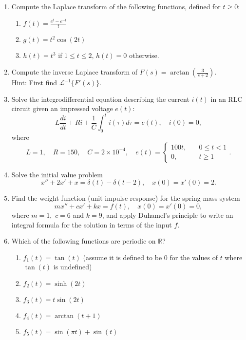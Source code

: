 \documentclass[11 pt]{article}
\newcommand{\R}{\mathbb{R}}
\newcommand{\calL}{\mathcal{L}}
\renewcommand{\t}{\tau}
\begin{document}
\begin{enumerate}
\item Compute the Laplace transform of the following functions, defined for $t\geq 0$:
\begin{enumerate}
     \item $\displaystyle f(t)=\frac{e^t-e^{-t}}{t}$ 

     \item $g(t)=t^2\cos(2t)$
     \item $h(t)=t^3$ if $1\leq t\leq 2$, $h(t)=0$ otherwise.
 \end{enumerate} 

\item Compute the inverse Laplace transform of $F(s)=\arctan \left(\frac{3}{s+2}\right)$. \\
Hint: First find $\calL^{-1}\{F'(s)\}$.


\item Solve the integrodifferential equation describing the current $i(t)$ in an RLC circuit given an impressed voltage $e(t):$
\begin{equation}
    L\frac{di}{dt}+R i+\frac{1}{C}\int_0^t i(\t)d\t =e(t), \quad i(0)=0,
\end{equation}
where
\begin{equation}
    L=1,\quad R=150,\quad C=2\times 10^{-4}, \quad  e(t)=\begin{cases}
        100t, \quad & 0\leq t<1\\
        0, \quad & t\geq 1
    \end{cases}.
\end{equation}



\item Solve the initial value problem
\begin{equation}
    x''+2x'+x=\delta(t)-\delta(t-2), \quad x(0)=x'(0)=2.
\end{equation}


\item Find the weight function (unit impulse response)  for the spring-mass system
\begin{equation}
    mx''+cx'+kx=f(t), \quad x(0)=x'(0)=0,
\end{equation}
where $m=1, $ $c=6$ and $k=9$,
and apply Duhamel's principle to write an integral formula for the solution in terms of the input $f$.

\item Which of the following functions are periodic on $\R$?
\begin{enumerate}
    \item $f_1(t)=\tan(t)$ (assume it is defined to be $0$ for the values of $t$ where $\tan(t)$ is undefined)
    \item $f_2(t)=\sinh(2t)$
    \item $f_3(t)=t\sin(2t)$
    \item $f_4(t)=\arctan(t+1)$
    \item $f_5(t)=\sin(\pi t)+\sin(t)$
\end{enumerate}



\end{enumerate}
\end{document}
